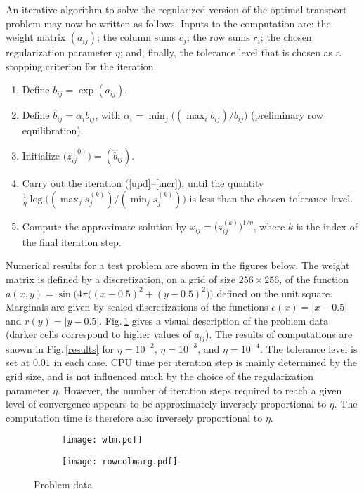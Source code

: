 \documentclass{article}
\theoremstyle{definition}
\begin{document}
An iterative algorithm to solve the regularized version of the optimal transport problem
may now be written as follows. Inputs to the computation are: the weight matrix $(a_{ij})$; the column sums $c_j$;
the row sums $r_i$; the chosen regularization parameter $\eta$; and, finally, the tolerance level that is chosen as a
stopping criterion for the iteration.
\begin{enumerate}
\item Define $b_{ij} = \exp(a_{ij})$.
\item Define $\hat{b}_{ij} = \alpha_i b_{ij}$, with $\alpha_i = \min_j\!\big((\max_i b_{ij})/b_{ij}\big)$
(preliminary row equilibration).
\item Initialize $\big(z_{ij}^{(0)}\big) = (\hat{b}_{ij})$.
\item Carry out the iteration (\ref{upd}--\ref{incr}), until the quantity
$\frac{1}{\eta} \log \!\big((\max_j s_j^{(k)})/(\min_j s_j^{(k)})\big)$
is less than the chosen tolerance level.
\item Compute the approximate solution by $x_{ij} = \big(z^{(k)}_{ij}\big)^{1/\eta}$, where $k$ is the index of the final iteration step.
\end{enumerate}

Numerical results for a test problem are shown in the figures below. The weight matrix is defined by a discretization, on
a grid of size $256 \times 256$, of the function $a(x,y) = \sin\!\big(4\pi \big( (x-0.5)^2 + (y-0.5)^2 \big)\big)$ defined on the
unit square.
Marginals are given by scaled discretizations of the functions $c(x) = |x-0.5|$ and $r(y) = |y-0.5|$. Fig.\,\ref{problemdata}
gives a visual description of the problem data (darker cells correspond to higher values of $a_{ij}$). The results of computations are shown in Fig.\,\ref{results} for $\eta = 10^{-2}$, $\eta=10^{-3}$, and $\eta=10^{-4}$. The tolerance level is set at $0.01$ in each case. CPU time per iteration step is mainly determined by the grid size, and is not
influenced much by the choice of the regularization parameter $\eta$. However, the number of
iteration steps required to reach a given level of convergence appears to be approximately inversely proportional to $\eta$.
The computation time is therefore also inversely proportional to $\eta$.

\begin{figure}
\begin{center}
\begin{subfigure}[b]{.4\linewidth}
\texttt{[image: wtm.pdf]}
\end{subfigure}
\begin{subfigure}[b]{.4\linewidth}
\texttt{[image: rowcolmarg.pdf]}
\end{subfigure}
\end{center}
\caption{Problem data \label{problemdata}}
\end{figure}
\end{document}
